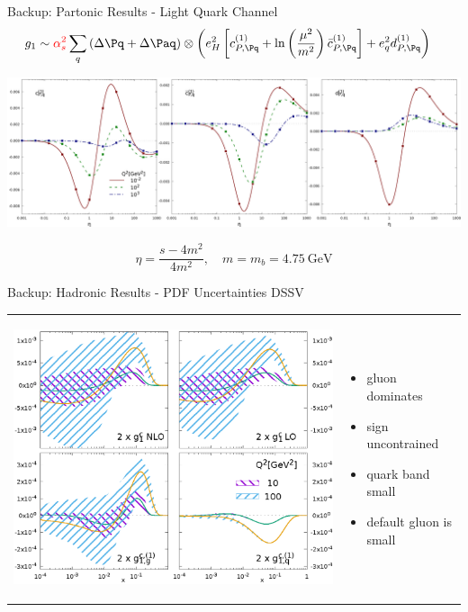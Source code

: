 \begin{frame}{Backup: Partonic Results - Light Quark Channel}
\begin{align*}
g_1 &\sim {\color{red}\alpha_s^2}\sum_{q}\left(\Delta \Pq+\Delta \Paq\right) \otimes \left(e_H^2\left[c_{P,\Pq}^{(1)} + \ln\left(\frac{\mu^2}{m^2}\right)\bar c_{P,\Pq}^{(1)}\right] + e_q^2 d_{P,\Pq}^{(1)}\right)
\end{align*}
\begin{center}
\includegraphics[width=\textwidth]{img/cdqP}
\end{center}
\[\eta = \frac{s-4m^2}{4m^2},\quad m=m_b=\SI{4.75}{\GeV}\]
\end{frame}


\begin{frame}{Backup: Hadronic Results - PDF Uncertainties DSSV}
\begin{tabular}{wn}
\begin{center}
\includegraphics[height=.95\textheight]{img/g1Parts-pdf}
\end{center} & 
\begin{itemize}
\item gluon dominates
\item sign uncontrained
\item quark band small
\item default gluon is small
\end{itemize}
\end{tabular}
\end{frame}

